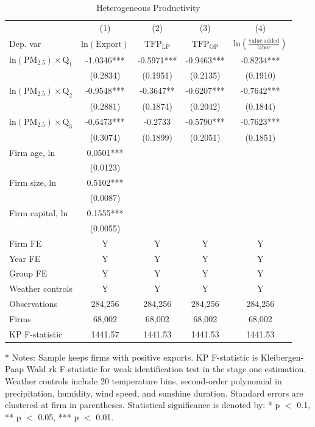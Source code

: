 \documentclass[12pt]{article}
\begin{document}
  \begin{table}[H]\centering
    \caption{Heterogeneous Productivity} \label{tab:hetero_tfp}
 \footnotesize
    \begin{tabular}{l*{4}{c}}
    \hline\hline
    &\multicolumn{1}{c}{(1)}&\multicolumn{1}{c}{(2)}&\multicolumn{1}{c}{(3)}&\multicolumn{1}{c}{(4)}\\
    Dep. var  &\multicolumn{1}{c}{$\mathrm{ln(Export)}$}&\multicolumn{1}{c}{$\mathrm{TFP_{LP}}$}&\multicolumn{1}{c}{$\mathrm{TFP_{OP}}$}&\multicolumn{1}{c}{$\mathrm{ln(\frac{value\ added}{labor})}$}\\ 
     \hline
$\mathrm{ln(PM_{2.5})\times Q_{1}}$   &-1.0346***&-0.5971***& -0.9463***&-0.8234***\\
                                       &(0.2834)&(0.1951)&(0.2135)&(0.1910)\\
$\mathrm{ln(PM_{2.5})\times Q_{2}}$   &-0.9548***&-0.3647**&-0.6207***&-0.7642***\\
                                       &(0.2881)&(0.1874)&(0.2042)&(0.1844)\\
$\mathrm{ln(PM_{2.5})\times Q_{3}}$   &-0.6473***&-0.2733&-0.5790***&-0.7623***\\
                                       &(0.3074)&(0.1899)&(0.2051)&(0.1851)\\                                        
Firm age, ln                          &0.0501***&&        &\\
                                      &(0.0123) &&        &\\
Firm size, ln                         &0.5102***&&        &\\
                                      &(0.0087) &&        &\\
Firm capital, ln                      &0.1555***&&        &\\
                                      &(0.0055)&&        &\\
     \hline
    Firm FE  &Y&Y&Y&Y\\
    Year FE  &Y&Y&Y&Y\\
    Group FE &Y&Y&Y&Y\\
    Weather controls &Y&Y&Y&Y\\
    \hline
    Observations    &284,256&284,256&284,256&284,256\\
    Firms           &68,002 &68,002 &68,002 &68,002 \\
    KP F-statistic	&1441.57&1441.53&1441.53&1441.53\\
    \hline\hline
    \end{tabular}
    \begin{tablenotes}
    \item[*] \small Notes: Sample keeps firms with positive exports. KP F-statistic is Kleibergen-Paap Wald rk F-statistic for weak identification test in the stage one estimation. Weather controls include 20 temperature bins, second-order polynomial in precipitation, humidity, wind speed, and sunshine duration. Standard errors are clustered at firm in parentheses. Statistical significance is denoted by: * p $<$ 0.1, ** p $<$ 0.05, *** p $<$ 0.01.
    \end{tablenotes}
    \end{table}
\end{document}
